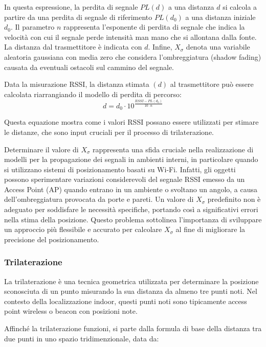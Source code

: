 \noindent In questa espressione, la perdita di segnale $PL(d)$ a una distanza $d$ si calcola a partire da una perdita di segnale di riferimento $PL(d_0)$ a una distanza iniziale $d_0$. Il parametro $n$ rappresenta l'esponente di perdita di segnale che indica la velocità con cui il segnale perde intensità man mano che si allontana dalla fonte. La distanza dal trasmettitore è indicata con $d$. Infine, $X_{\sigma}$ denota una variabile aleatoria gaussiana con media zero che considera l'ombreggiatura (shadow fading) causata da eventuali ostacoli sul cammino del segnale.

Data la misurazione RSSI, la distanza stimata $(d)$ al trasmettitore può essere calcolata riarrangiando il modello di perdita di percorso:
\begin{equation}
    \displaystyle{d = d_0 \cdot 10^{\frac{RSSI - PL(d_0)}{10 \cdot n}}}
\end{equation}

\noindent Questa equazione mostra come i valori RSSI possano essere utilizzati per stimare le distanze, che sono input cruciali per il processo di trilaterazione.

Determinare il valore di $X_{\sigma}$ rappresenta una sfida cruciale nella realizzazione di modelli per la propagazione dei segnali in ambienti interni, in particolare quando si utilizzano sistemi di posizionamento basati su Wi-Fi. Infatti, gli oggetti possono sperimentare variazioni considerevoli del segnale RSSI emesso da un Access Point (AP) quando entrano in un ambiente o svoltano un angolo, a causa dell'ombreggiatura provocata da porte e pareti. Un valore di $X_{\sigma}$ predefinito non è adeguato per soddisfare le necessità specifiche, portando così a significativi errori nella stima della posizione. Questo problema sottolinea l'importanza di sviluppare un approccio più flessibile e accurato per calcolare $X_{\sigma}$ al fine di migliorare la precisione del posizionamento.

\subsubsection{Trilaterazione}
\hspace{\parindent}La trilaterazione è una tecnica geometrica utilizzata per determinare la posizione sconosciuta di un punto misurando la sua distanza da almeno tre punti noti. Nel contesto della localizzazione indoor, questi punti noti sono tipicamente access point wireless o beacon con posizioni note.

\noindent Affinché la trilaterazione funzioni, si parte dalla formula di base della distanza tra due punti in uno spazio tridimenzionale, data da:

